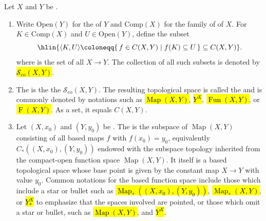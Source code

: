 \begin{definition} \label{definition:compact_open_topology_on_the_set_of_continuous_maps_between_topological_spaces_and_function_space}
    Let $X$ and $Y$ be . 
    \begin{enumerate}
        \item Write $\mathrm{Open}(Y)$ for the  of $Y$ and $\mathrm{Comp}(X)$ for the family of  of $X$. 
        For $K \in \mathrm{Comp}(X)$ and $U \in \mathrm{Open}(Y)$, define the subset
        $$\hlin{\langle K,U\rangle \coloneqq \{\, f \in C(X,Y) \mid f(K) \subseteq U \,\} \subseteq C(X,Y)}.$$
        where  is the set of all  $X \to Y$. 
        The collection of all such subsets is denoted by \hl{$\mathcal{S}_{\mathrm{co}}(X,Y)$}.

        \item The   is the   the  $\mathcal{S}_{\mathrm{co}}(X,Y)$. The resulting topological space is called the  and is commonly denoted by notations such as \hl{$\operatorname{Map}(X,Y)$}, \hl{$Y^X$}, \hl{$\operatorname{Fun}(X,Y)$}, or \hl{$\operatorname{F}(X,Y)$}. As a set, it equals $C(X,Y)$.

        \item Let $(X,x_0)$ and $(Y,y_0)$ be . The  is the subspace of $\operatorname{Map}(X,Y)$ consisting of all based maps $f$ with $f(x_0)=y_0$, equivalently $C_*((X,x_0),(Y,y_0))$ endowed with the subspace topology inherited from the compact-open function space $\operatorname{Map}(X,Y)$. It itself is a based topological space whose base point is given by the constant map $X \to Y$ with value $y_0$. Common notations for the based function space include those which include a star or bullet such as \hl{$\operatorname{Map}_*((X,x_0),(Y,y_0))$}, \hl{$\operatorname{Map}_*(X,Y)$}, or \hl{$Y^X_*$} to emphasize that the spaces involved are pointed, or those which omit a star or bullet, such as \hl{$\operatorname{Map}(X,Y)$}, and \hl{$Y^X$}. 
    \end{enumerate}
\end{definition}


